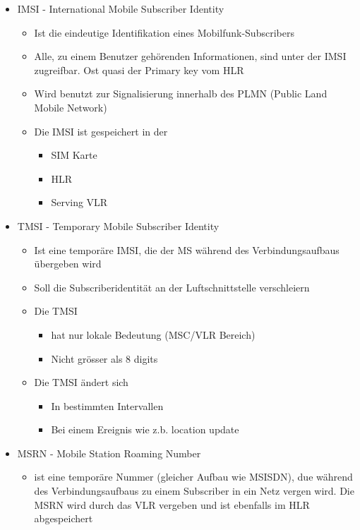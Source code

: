 \begin{minipage}{0.6 \linewidth}
\begin{itemize}
\item IMSI - International Mobile Subscriber Identity
\begin{itemize}
\item Ist die eindeutige Identifikation eines Mobilfunk-Subscribers
\item Alle, zu einem Benutzer gehörenden Informationen, sind unter der IMSI zugreifbar. Ost quasi der Primary key vom HLR
\item Wird benutzt zur Signalisierung innerhalb des PLMN (Public Land Mobile Network)
\item Die IMSI ist gespeichert in der
\begin{itemize}
\item SIM Karte 
\item HLR
\item Serving VLR
\end{itemize}
\end{itemize}
\item TMSI - Temporary Mobile Subscriber Identity 
\begin{itemize}
\item Ist eine temporäre IMSI, die der MS während des Verbindungsaufbaus übergeben wird
\item Soll die Subscriberidentität an der Luftschnittstelle verschleiern
\item Die TMSI
\begin{itemize}
\item hat nur lokale Bedeutung (MSC/VLR Bereich)
\item Nicht grösser als 8 digits
\end{itemize}
\item Die TMSI ändert sich
\begin{itemize}
\item In bestimmten Intervallen
\item Bei einem Ereignis wie z.b. location update
\end{itemize}
\end{itemize}
\item MSRN - Mobile Station Roaming Number
\begin{itemize}
\item ist eine temporäre Nummer (gleicher Aufbau wie MSISDN), due während des Verbindungsaufbaus zu einem Subscriber in ein Netz vergen wird. Die MSRN wird durch das VLR vergeben und ist ebenfalls im HLR abgespeichert
\end{itemize}

\end{itemize}
\end{minipage}
